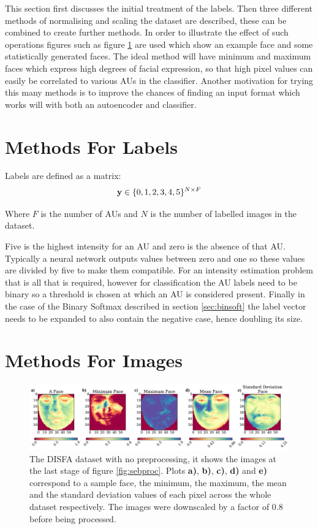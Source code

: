     This section first discusses the initial treatment of the labels.
    Then three different methods of normalising and scaling
    the dataset are described, these can be combined to create further methods. In order to illustrate
    the effect of such operations figures such as figure \ref{fig:faces_none} are used which
    show an example face and some statistically generated faces. The ideal method will
    have minimum and maximum faces which express high degrees of facial expression, so that
    high pixel values can easily be correlated to various AUs in the classifier. Another motivation
    for trying this many methods is to improve the chances of finding an input format which works will with both an
    autoencoder and classifier.

    \section{Methods For Labels}

      Labels are defined as a matrix:
      \begin{equation}
        {\bf y} \in \{0,1,2,3,4,5\}^{N\times F}
      \end{equation}

      Where $F$ is the number of AUs and $N$ is the number of labelled images
      in the dataset.

      Five is the highest intensity for an AU and zero is the absence of that AU.
      Typically a neural network outputs values between zero and one so these values are divided by five to make them compatible.
      For an intensity estimation problem that is all that is required, however for classification
      the AU labels need to be binary so a threshold is chosen at which an AU is considered present.
      Finally in the case of the Binary Softmax described in section \ref{sec:binsoft} the label vector
      needs to be expanded to also contain the negative case, hence doubling its size.

  \section{Methods For Images} \label{sec:methods}

    \begin{figure}[!h] \centering
    \includegraphics[width =\hsize]{figures/faces.pdf}
    \caption{The DISFA dataset with no preprocessing, it shows
    the images at the last stage of figure \ref{fig:sebproc}.
    Plots {\bf a)}, {\bf b)}, {\bf c)}, {\bf d)} and {\bf e)}
    correspond to a sample face, the minimum, the maximum,
    the mean and the standard deviation values of each pixel across
    the whole dataset respectively. The images were downscaled by a factor of 0.8 before being processed.}
    \label{fig:faces_none} \end{figure}


